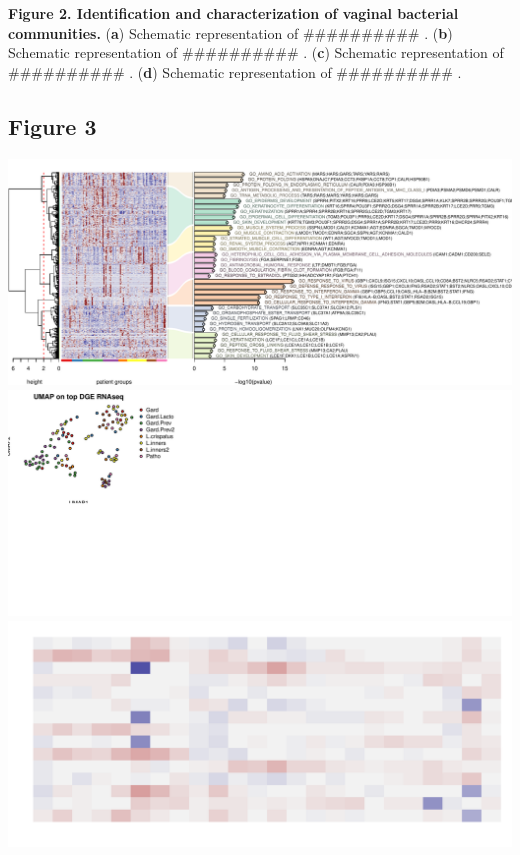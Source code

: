 \documentclass[
]{article}
\begin{document}
\textbf{Figure 2. Identification and characterization of vaginal bacterial communities.}
(\textbf{a}) Schematic representation of \#\#\#\#\#\#\#\#\#\# .
(\textbf{b}) Schematic representation of \#\#\#\#\#\#\#\#\#\# .
(\textbf{c}) Schematic representation of \#\#\#\#\#\#\#\#\#\# .
(\textbf{d}) Schematic representation of \#\#\#\#\#\#\#\#\#\# .

\clearpage

\hypertarget{figure-3}{%
\subsection{Figure 3}\label{figure-3}}

\includegraphics[width=1\linewidth]{manuscript_template_files/figure-latex/unnamed-chunk-7-1}
\includegraphics[width=1\linewidth]{manuscript_template_files/figure-latex/unnamed-chunk-7-2}
\includegraphics[width=1\linewidth]{manuscript_template_files/figure-latex/unnamed-chunk-7-3}
\end{document}
